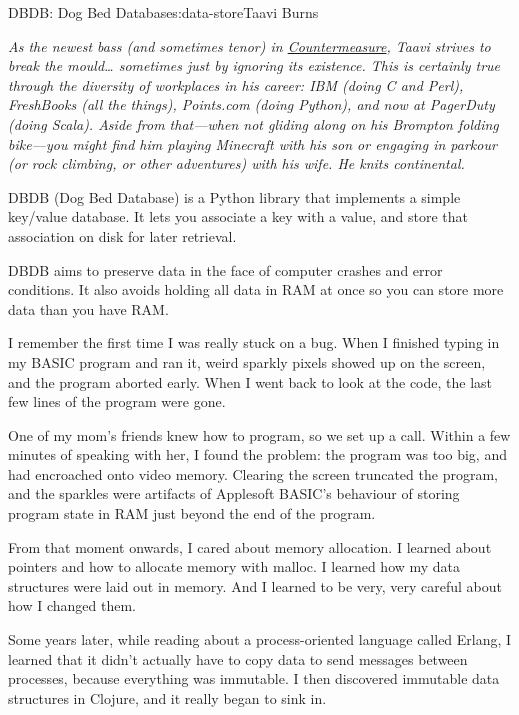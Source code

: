 \begin{aosachapter}{DBDB: Dog Bed Database}{s:data-store}{Taavi Burns}

\emph{As the newest bass (and sometimes tenor) in
\href{http://www.countermeasuremusic.com}{Countermeasure}, Taavi strives
to break the mould\ldots{} sometimes just by ignoring its existence.
This is certainly true through the diversity of workplaces in his
career: IBM (doing C and Perl), FreshBooks (all the things), Points.com
(doing Python), and now at PagerDuty (doing Scala). Aside from
that---when not gliding along on his Brompton folding bike---you might
find him playing Minecraft with his son or engaging in parkour (or rock
climbing, or other adventures) with his wife. He knits continental.}

\label{introduction}

DBDB (Dog Bed Database) is a Python library that implements a simple
key/value database. It lets you associate a key with a value, and store
that association on disk for later retrieval.

DBDB aims to preserve data in the face of computer crashes and error
conditions. It also avoids holding all data in RAM at once so you can
store more data than you have RAM.

\label{memory}

I remember the first time I was really stuck on a bug. When I finished
typing in my BASIC program and ran it, weird sparkly pixels showed up on
the screen, and the program aborted early. When I went back to look at
the code, the last few lines of the program were gone.

One of my mom's friends knew how to program, so we set up a call. Within
a few minutes of speaking with her, I found the problem: the program was
too big, and had encroached onto video memory. Clearing the screen
truncated the program, and the sparkles were artifacts of Applesoft
BASIC's behaviour of storing program state in RAM just beyond the end of
the program.

From that moment onwards, I cared about memory allocation. I learned
about pointers and how to allocate memory with malloc. I learned how my
data structures were laid out in memory. And I learned to be very, very
careful about how I changed them.

Some years later, while reading about a process-oriented language called
Erlang, I learned that it didn't actually have to copy data to send
messages between processes, because everything was immutable. I then
discovered immutable data structures in Clojure, and it really began to
sink in.


\end{aosachapter}
